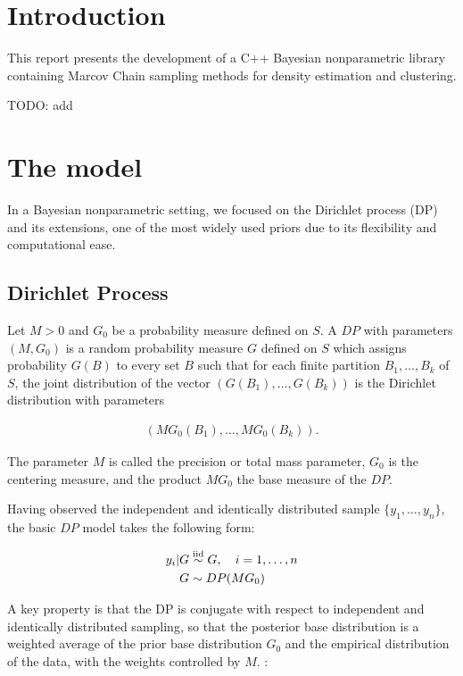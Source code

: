 
 
 
\section{Introduction}
This report presents the development of a C++ Bayesian nonparametric library containing Marcov Chain sampling methods for density estimation and clustering. 

TODO: add

\section{The model}

In a Bayesian nonparametric setting, we focused on the Dirichlet process (DP) and its extensions, one of the most widely used priors due to its flexibility and computational ease.


\subsection{Dirichlet Process}
Let $M>0$ and $G_0$ be a probability measure defined on $S$. A $DP$ with parameters $(M,G_0)$ is a random probability measure $G$ defined on $S$ which assigns probability $G(B)$ to every set $B$ such that for each finite partition ${B_1,\dots,B_k}$ of $S$, the joint distribution of the  vector $(G(B_1),\dots,G(B_k))$ is the Dirichlet distribution with parameters 

\begin{align*}
(MG_0(B_1),\dots,MG_0(B_k)).
\end{align*}

The parameter $M$ is called the precision or total mass parameter, $G_0$ is
the centering measure, and the product $MG_0$ the base measure
of the $DP$.

Having observed the independent and identically distributed sample $\{y_1,\dots,y_n\}$, the basic $DP$ model takes the following form:

\begin{align}
		y_i | G &\stackrel{\text{iid}}{\sim} G, \quad i=1,\dots,n \\
		G &\sim DP(MG_0) \nonumber
\end{align}



A key property is that the DP is conjugate with respect to independent and identically distributed sampling, so that
the posterior base distribution is a weighted average of the prior base distribution $G_0$ and the empirical distribution of the data, with the weights controlled by $M$.  :

